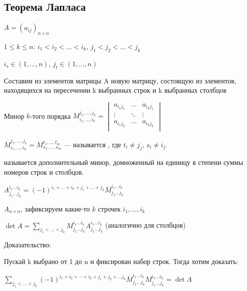 \subsection{Теорема Лапласа}

\(A =(a_{ij})_{n \times n}\)

\(1 \leq k \leq n\): \(i_1 < i_2 < \ldots < i_k\), \(j_1 < j_2 < \ldots < j_k\)

\(i_s \in (1, \ldots, n)\), \(j_t \in (1, \ldots, n)\)

Составим из элементов матрицы A новую матрицу, состоящую из элементов, находящихся на пересечении k выбранных строк и k выбранных столбцов

Минор \(k\)-того порядка \(M_{i_1, \ldots, i_k}^{j_1, \ldots, j_k} =
\begin{vmatrix}
    a_{i_1 j_1} & \ldots & a_{i_k j_1} \\
    \vdots      & \ddots & \vdots      \\
    a_{i_1 j_k} & \ldots & a_{i_k j_k} \\
\end{vmatrix}\)

\(\overline{M}_{i_1, \ldots, i_k}^{j_1, \ldots, j_k} = M_{s_1, \ldots, s_m}^{t_1, \ldots, t_m}\) --- называется , где $t_i \neq j_j$, $s_i\neq i_j$.

 называется дополнительный минор, домноженный на единицу в степени суммы номеров строк и столбцов.

$A_{j_1\dots j_k}^{i_1\dots i_k} = (-1)^{i_1+\dots+i_k+j_1+\dots+j_k}\overline{M}_{j_1\dots j_k}^{i_1\dots i_k}$


\(A_{n\times n }\), зафиксируем какие-то $k$ строчек $i_1,\ldots, i_k$

\(\det A = \sum\limits_{j_1<\ldots<j_k} {M}_{j_1\ldots j_k}^{i_1\ldots i_k} A_{j_1\ldots j_k}^{i_1\ldots i_k}\) (аналогично для столбцов)

Доказательство:

Пускай k выбрано от 1 до n и фиксирован набор строк. Тогда хотим доказать:

\(\sum\limits_{j_1<\ldots<j_k}(-1)^{i_1+i_2+ \cdots +i_k+ j_1 +j_2 + \ldots j_k} \overline{M}_{j_1\ldots j_k}^{i_1\ldots i_k} M_{j_1\ldots j_k}^{i_1\ldots i_k} = \det A\)

